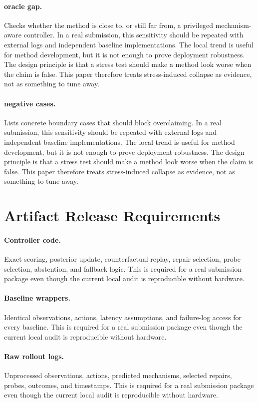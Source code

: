 \documentclass{article}
\begin{document}
\paragraph{oracle gap.} Checks whether the method is close to, or still far from, a privileged mechanism-aware controller. In a real submission, this sensitivity should be repeated with external logs and independent baseline implementations. The local trend is useful for method development, but it is not enough to prove deployment robustness.
The design principle is that a stress test should make a method look worse when the claim is false. This paper therefore treats stress-induced collapse as evidence, not as something to tune away.
\paragraph{negative cases.} Lists concrete boundary cases that should block overclaiming. In a real submission, this sensitivity should be repeated with external logs and independent baseline implementations. The local trend is useful for method development, but it is not enough to prove deployment robustness.
The design principle is that a stress test should make a method look worse when the claim is false. This paper therefore treats stress-induced collapse as evidence, not as something to tune away.
\clearpage
\section{Artifact Release Requirements}
\paragraph{Controller code.} Exact scoring, posterior update, counterfactual replay, repair selection, probe selection, abstention, and fallback logic. This is required for a real submission package even though the current local audit is reproducible without hardware.
\paragraph{Baseline wrappers.} Identical observations, actions, latency assumptions, and failure-log access for every baseline. This is required for a real submission package even though the current local audit is reproducible without hardware.
\paragraph{Raw rollout logs.} Unprocessed observations, actions, predicted mechanisms, selected repairs, probes, outcomes, and timestamps. This is required for a real submission package even though the current local audit is reproducible without hardware.
\end{document}
